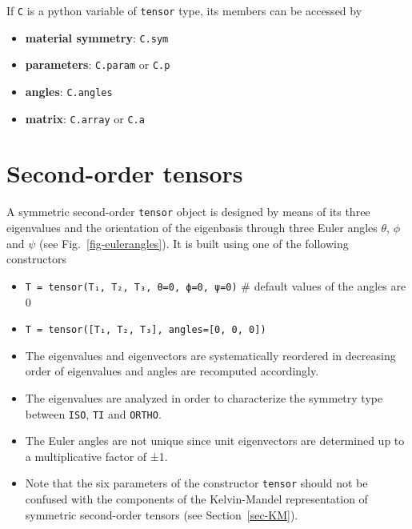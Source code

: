 \documentclass[
  letterpaper,
  DIV=11,
  numbers=noendperiod]{scrreprt}
\providecommand{\tightlist}{%
  \setlength{\itemsep}{0pt}\setlength{\parskip}{0pt}}\usepackage{longtable,booktabs,array}
\begin{document}
If \texttt{C} is a python variable of \texttt{tensor} type, its members
can be accessed by

\begin{itemize}
\tightlist
\item
  \textbf{material symmetry}: \texttt{C.sym}
\item
  \textbf{parameters}: \texttt{C.param} or \texttt{C.p}
\item
  \textbf{angles}: \texttt{C.angles}
\item
  \textbf{matrix}: \texttt{C.array} or \texttt{C.a}
\end{itemize}

\section{Second-order tensors}\label{second-order-tensors}

A symmetric second-order \texttt{tensor} object is designed by means of
its three eigenvalues and the orientation of the eigenbasis through
three Euler angles \(\theta\), \(\phi\) and \(\psi\) (see
Fig.~\ref{fig-eulerangles}). It is built using one of the following
constructors

\begin{itemize}
\tightlist
\item
  \texttt{T\ =\ tensor(T₁,\ T₂,\ T₃,\ θ=0,\ ϕ=0,\ ψ=0)} \# default
  values of the angles are 0
\item
  \texttt{T\ =\ tensor({[}T₁,\ T₂,\ T₃{]},\ angles={[}0,\ 0,\ 0{]})}
\end{itemize}

\begin{tcolorbox}[enhanced jigsaw, left=2mm, bottomrule=.15mm, colbacktitle=quarto-callout-warning-color!10!white, colback=white, colframe=quarto-callout-warning-color-frame, rightrule=.15mm, bottomtitle=1mm, toptitle=1mm, titlerule=0mm, title=\textcolor{quarto-callout-warning-color}{\faExclamationTriangle}\hspace{0.5em}{Warning}, toprule=.15mm, arc=.35mm, opacityback=0, opacitybacktitle=0.6, leftrule=.75mm, breakable, coltitle=black]

\begin{itemize}
\tightlist
\item
  The eigenvalues and eigenvectors are systematically reordered in
  decreasing order of eigenvalues and angles are recomputed accordingly.
\item
  The eigenvalues are analyzed in order to characterize the symmetry
  type between \texttt{ISO}, \texttt{TI} and \texttt{ORTHO}.
\item
  The Euler angles are not unique since unit eigenvectors are determined
  up to a multiplicative factor of ±1.
\item
  Note that the six parameters of the constructor \texttt{tensor} should
  not be confused with the components of the Kelvin-Mandel
  representation of symmetric second-order tensors (see
  Section~\ref{sec-KM}).
\end{itemize}

\end{tcolorbox}
\end{document}

